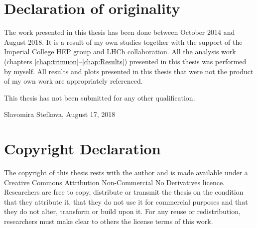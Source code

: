 \chapter*{Declaration of originality}
The work presented in this thesis has been done between October 2014 and August 2018. It is a result of my own studies together with the support of the Imperial College HEP group and LHCb collaboration. All the analysis work (chapters \ref{chap:trimuon}--\ref{chap:Results}) presented in this thesis was performed by myself. All results and plots presented in this thesis that were not the product of my own work are appropriately referenced. %

\vspace{1cm}
This thesis has not been submitted for any other qualification.

\vspace{1cm}



Slavomira Stefkova, \vspace{1cm} August 17, 2018


\vspace{5cm}

\clearpage
{}
{}
\chapter*{Copyright Declaration}
The copyright of this thesis rests with the author and is made available under a Creative Commons Attribution Non-Commercial No Derivatives licence. Researchers are free to copy, distribute or transmit the thesis on the condition that they attribute it, that they do not use it for commercial purposes and that they do not alter, transform or build upon it. For any reuse or redistribution, researchers must make clear to others the license terms of this work.
